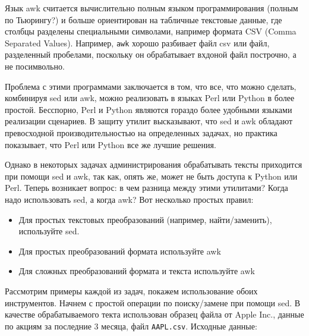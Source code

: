 \documentclass{report}
\begin{document}
Язык awk считается вычислительно полным языком программирования (полным
по Тьюрингу?) и больше ориентирован на табличные текстовые данные, где
столбцы разделены специальными символами, например формата CSV (Comma
Separated Values). Например, \texttt{awk} хорошо разбивает файл csv или
файл, разделенный пробелами, поскольку он обрабатывает вхдоной файл
построчно, а не посимвольно.

Проблема с этими программами заключается в том, что все, что можно
сделать, комбинируя sed или awk, можно реализовать в языках Perl или
Python в более простой. Бесспорно, Perl и Python являются гораздо более
удобными языками реализации сценариев. В защиту утилит высказывают, что
sed и awk обладают превосходной производительностью на определенных
задачах, но практика показывает, что Perl или Python все же лучшие
решения.

Однако в некоторых задачах администрирования обрабатывать тексты
приходится при помощи sed и awk, так как, опять же, может не быть
доступа к Python или Perl. Теперь возникает вопрос: в чем разница между
этими утилитами? Когда надо использовать sed, а когда awk? Вот несколько
простых правил:

\begin{itemize}
\tightlist
\item
  Для простых текстовых преобразований (например, найти/заменить),
  используйте sed.
\item
  Для простых преобразований формата используйте awk
\item
  Для сложных преобразований формата и текста используйте awk
\end{itemize}

Рассмотрим примеры каждой из задач, покажем использование обоих
инструментов. Начнем с простой операции по поиску/замене при помощи sed.
В качестве обрабатываемого текта использован образец файла от Apple
Inc., данные по акциям за последние 3 месяца, файл \texttt{AAPL.csv}.
Исходные данные:
\end{document}
